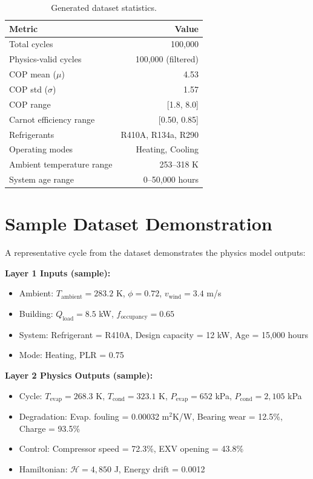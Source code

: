 \documentclass[11pt]{article}
\begin{document}
\begin{table}[h]
\caption{Generated dataset statistics.}
\label{tab:dataset_stats}
\centering
\begin{tabular}{@{}lr@{}}
\toprule
\textbf{Metric} & \textbf{Value} \\
\midrule
Total cycles & 100,000 \\
Physics-valid cycles & 100,000 (filtered) \\
COP mean ($\mu$) & 4.53 \\
COP std ($\sigma$) & 1.57 \\
COP range & [1.8, 8.0] \\
Carnot efficiency range & [0.50, 0.85] \\
Refrigerants & R410A, R134a, R290 \\
Operating modes & Heating, Cooling \\
Ambient temperature range & 253--318 K \\
System age range & 0--50,000 hours \\
\bottomrule
\end{tabular}
\end{table}

\section{Sample Dataset Demonstration}

A representative cycle from the dataset demonstrates the physics model outputs:

\textbf{Layer 1 Inputs (sample):}
\begin{itemize}
\item Ambient: $T_{\text{ambient}} = 283.2$ K, $\phi = 0.72$, $v_{\text{wind}} = 3.4$ m/s
\item Building: $Q_{\text{load}} = 8.5$ kW, $f_{\text{occupancy}} = 0.65$
\item System: Refrigerant = R410A, Design capacity = 12 kW, Age = 15,000 hours
\item Mode: Heating, PLR = 0.75
\end{itemize}

\textbf{Layer 2 Physics Outputs (sample):}
\begin{itemize}
\item Cycle: $T_{\text{evap}} = 268.3$ K, $T_{\text{cond}} = 323.1$ K, $P_{\text{evap}} = 652$ kPa, $P_{\text{cond}} = 2,105$ kPa
\item Degradation: Evap. fouling = 0.00032 m$^2$K/W, Bearing wear = 12.5\%, Charge = 93.5\%
\item Control: Compressor speed = 72.3\%, EXV opening = 43.8\%
\item Hamiltonian: $\mathcal{H} = 4,850$ J, Energy drift = 0.0012
\end{itemize}
\end{document}
